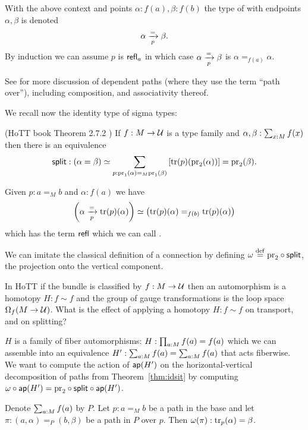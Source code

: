 \begin{mydef}
With the above context and points \( \alpha:f(a), \beta:f(b) \) the type of  with endpoints \( \alpha, \beta \) is denoted
\[ \alpha\xrightarrow[{p}]{=}\beta.
\]
By induction we can assume \( p \) is \( \mathsf{refl}_a \) in which case \( \alpha\xrightarrow[{p}]{=}\beta \) is \( \alpha=_{f(a)}\alpha \).
\end{mydef}

See \cite{Symmetry} for more discussion of dependent paths (where they use the term ``path over''), including composition, and associativity thereof.

We recall now the identity type of sigma types:

\begin{mythm}\label{thm:idsit}
(HoTT book Theorem 2.7.2 \cite{hottbook}) If \( f:M\to \mathcal{U} \) is a type family and \( \alpha,\beta:\sum_{x:M}f(x) \) then there is an equivalence 
\[ 
\mathsf{split}:(\alpha=\beta)\simeq \sum_{p:\mathrm{pr}_1(\alpha)=_M\mathrm{pr}_1(\beta)} \left[\mathrm{tr}(p)(\mathrm{pr}_2(\alpha))\right] = \mathrm{pr}_2(\beta).
\]
\end{mythm}

\begin{mydef}
Given \( p:a=_M b \) and \( \alpha:f(a) \) we have 
\[
\left(\alpha\xrightarrow[{p}]{=}\mathrm{tr}(p)(\alpha)\right)\simeq \left(\mathrm{tr}(p)(\alpha)=_{f(b)}\mathrm{tr}(p)(\alpha)\right)
\]
which has the term \( \mathsf{refl} \) which we can call .
\end{mydef}

 We can imitate the classical definition of a connection by defining \( \omega\stackrel{\mathrm{def}}{=} \mathrm{pr}_2\circ\mathsf{split} \), the projection onto the vertical component.

In HoTT if the bundle is classified by \( f:M\to \mathcal{U} \) then an automorphism is a homotopy \( H:f\sim f \) and the group of gauge transformations is the loop space \( \Omega_f(M\to \mathcal{U}) \). What is the effect of applying a homotopy \( H:f\sim f \) on transport, and on splitting?

\( H \) is a family of fiber automorphisms: \( H:\prod_{a:M}f(a)=f(a) \) which we can assemble into an equivalence \( H':\sum_{a:M}f(a)=\sum_{a:M}f(a) \) that acts fiberwise. We want to compute the action of \( \mathsf{ap}(H') \) on the horizontal-vertical decomposition of paths from Theorem~\ref{thm:idsit} by computing \( \omega\circ\mathsf{ap}(H')=\mathrm{pr}_2\circ\mathsf{split}\circ\mathsf{ap}(H') \).

Denote \( \sum_{a:M}f(a) \) by \( P \). Let \( p:a=_M b \) be a path in the base and let \( \pi:(a,\alpha)=_P (b,\beta) \) be a path in \( P \) over \( p \). Then \( \omega(\pi):\mathrm{tr}_p(\alpha)=\beta \).

